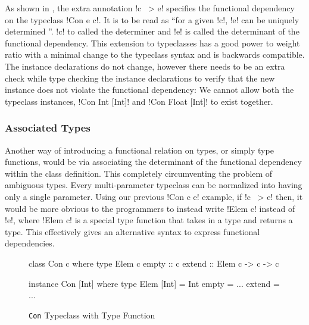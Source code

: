 \documentclass[screen,nonacm]{acmart}
\begin{document}
As shown in , the extra annotation !c ~> e! specifies the functional dependency on the typeclass !Con e c!. It is to be read as ``for a given !c!, !e! can be uniquely determined ''. !c! to called the determiner and !e! is called the determinant of the functional dependency. This extension to typeclasses has a good power to weight ratio with a minimal change to the typeclass syntax and is backwards compatible. The instance declarations do not change, however there needs to be an extra check while type checking the instance declarations to verify that the new instance does not violate the functional dependency: We cannot allow both the typeclass instances, !Con Int [Int]! and !Con Float [Int]! to exist together.
%

\subsubsection{Associated Types}
Another way of introducing a functional relation on types, or simply type functions, would be via associating the determinant of the functional dependency within the class definition\cite{chakravarty_associated_2005}. This completely circumventing the problem of ambiguous types. Every multi-parameter typeclass can be normalized into having only a single parameter. Using our previous !Con c e! example, if !c ~> e! then, it would be more obvious to the programmers to instead write !Elem c! instead of !e!, where !Elem c! is a special type function that takes in a type and returns a type. This effectively gives an alternative syntax to express functional dependencies.
\begin{figure}[ht]
\begin{center}
\begin{minipage}[ht]{0.4\linewidth}
\begin{code}
class Con c where
  type Elem c
  empty :: c
  extend :: Elem c -> c -> c
\end{code}
\end{minipage}%
\begin{minipage}[ht]{0.4\linewidth}
\begin{code}
instance Con [Int] where
  type Elem [Int] = Int
  empty = ...
  extend = ...
\end{code}
\end{minipage}
\end{center}
\caption[Con typeclass]{\lstinline{Con} Typeclass with Type Function}
\label{fig:assoc-types}
\end{figure}
\end{document}

